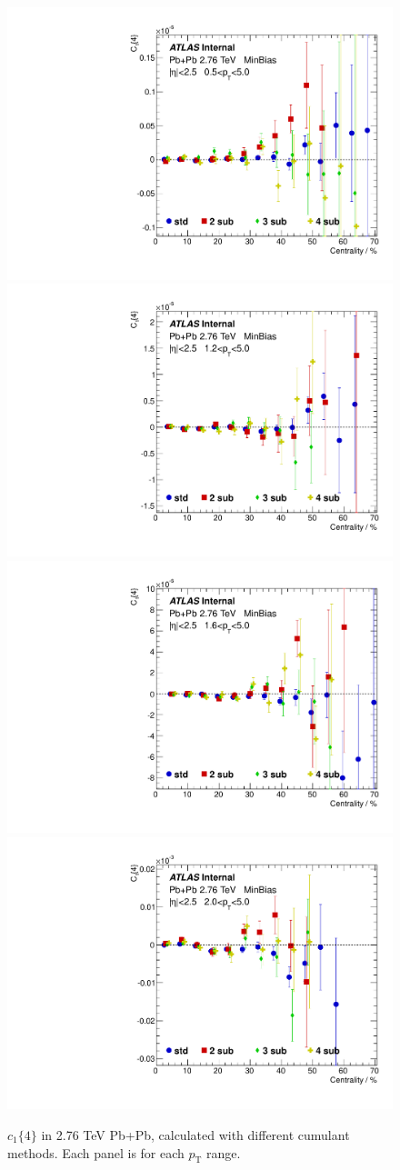 \begin{figure}[H]
\centering
\includegraphics[width=.245\linewidth]{figs/sec_appendix/PbPb276/PbPb276_mtd_Har1_Pt0.pdf}
\includegraphics[width=.245\linewidth]{figs/sec_appendix/PbPb276/PbPb276_mtd_Har1_Pt2.pdf}
\includegraphics[width=.245\linewidth]{figs/sec_appendix/PbPb276/PbPb276_mtd_Har1_Pt4.pdf}
\includegraphics[width=.245\linewidth]{figs/sec_appendix/PbPb276/PbPb276_mtd_Har1_Pt6.pdf}
\caption{$c_1\{4\}$ in 2.76 TeV Pb+Pb, calculated with different cumulant methods. Each panel is for each $p_\text{T}$ range.}
\label{fig:PbPb276_mtd_v1}
\end{figure}

